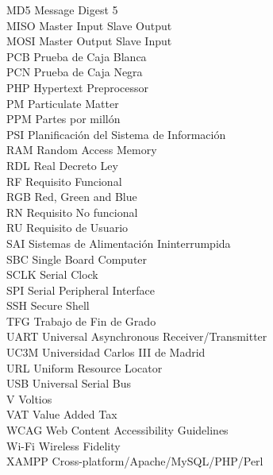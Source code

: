 \begin{tabbing}
	MD5 \> Message Digest 5 \\
	MISO \> Master Input Slave Output \\
	MOSI \> Master Output Slave Input \\
	PCB \> Prueba de Caja Blanca \\
	PCN \> Prueba de Caja Negra \\
	PHP \> Hypertext Preprocessor \\
	PM \> Particulate Matter \\
	PPM \> Partes por millón \\
	PSI \> Planificación del Sistema de Información \\
	RAM \> Random Access Memory \\
	RDL \> Real Decreto Ley \\
	RF \> Requisito Funcional \\
	RGB \> Red, Green and Blue \\
	RN \> Requisito No funcional \\
	RU \> Requisito de Usuario \\
	SAI \> Sistemas de Alimentación Ininterrumpida \\
	SBC \> Single Board Computer \\
	SCLK \> Serial Clock \\
	SPI \> Serial Peripheral Interface \\
	SSH \> Secure Shell \\
	TFG \> Trabajo de Fin de Grado \\
	UART \> Universal Asynchronous Receiver/Transmitter \\
	UC3M \> Universidad Carlos III de Madrid \\
	URL \> Uniform Resource Locator \\
	USB \> Universal Serial Bus \\
	V \> Voltios \\
	VAT \> Value Added Tax \\
	WCAG \> Web Content Accessibility Guidelines \\
	Wi-Fi \> Wireless Fidelity \\
	XAMPP \> Cross-platform/Apache/MySQL/PHP/Perl
\end{tabbing}

\newpage %
\thispagestyle{empty}
\mbox{}